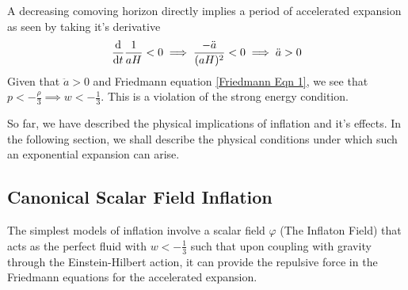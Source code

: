 \documentclass[aps,prd,reprint,preprintnumbers,showpacs,floatfix,nofootinbib,superscript address]{revtex4-2}
\begin{document}
A decreasing comoving horizon directly implies a period of accelerated expansion as seen by taking it's derivative
\begin{equation}
    \frac{\mathrm{d}}{\mathrm{d}t} \frac{1}{aH} <  0 \implies \frac{-\Ddot{a}}{(aH)^2} < 0 \implies \ddot{a} > 0
\end{equation}
Given that $\ddot{a} > 0$ and Friedmann equation \ref{Friedmann Eqn 1}, we see that $p < -\frac{\rho}{3} \implies w < - \frac{1}{3}$. This is a violation of the strong energy condition.

So far, we have described the physical implications of inflation and it's effects. In the following section, we shall describe the physical conditions under which such an exponential expansion can arise. 

\subsection{Canonical Scalar Field Inflation} \label{Canonical Scalar Field Inflation}
The simplest models of inflation involve a scalar field $\varphi$ (The Inflaton Field) that acts as the perfect fluid with $w < -\frac{1}{3}$ such that upon coupling with gravity through the Einstein-Hilbert action, it can provide the repulsive force in the Friedmann equations for the accelerated expansion.
\end{document}
